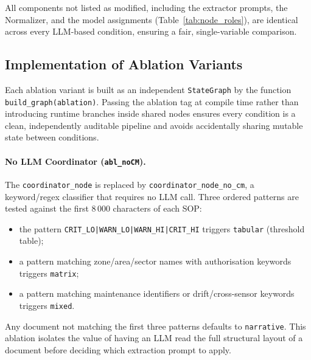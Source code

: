 ﻿\documentclass[11pt]{article}
\begin{document}
All components not listed as modified, including the extractor prompts, the
Normalizer, and the model assignments (Table~\ref{tab:node_roles}), are
identical across every LLM-based condition, ensuring a fair, single-variable
comparison.

\subsection{Implementation of Ablation Variants}
\label{sec:ablation_impl}

Each ablation variant is built as an independent \texttt{StateGraph} by the
function \texttt{build\_graph(ablation)}. Passing the ablation tag at compile
time rather than introducing runtime branches inside shared nodes ensures
every condition is a clean, independently auditable pipeline and avoids
accidentally sharing mutable state between conditions.

\paragraph{No LLM Coordinator (\texttt{abl\_noCM}).}
The \texttt{coordinator\_node} is replaced by \texttt{coordinator\_node\_no\_cm},
a keyword/regex classifier that requires no LLM call.
Three ordered patterns are tested against the first 8\,000 characters of each SOP:
\begin{itemize}
    \item the pattern \texttt{CRIT\_LO|WARN\_LO|WARN\_HI|CRIT\_HI} triggers
          \texttt{tabular} (threshold table);
    \item a pattern matching zone/area/sector names with authorisation keywords
          triggers \texttt{matrix};
    \item a pattern matching maintenance identifiers or drift/cross-sensor keywords
          triggers \texttt{mixed}.
\end{itemize}
Any document not matching the first three patterns defaults to \texttt{narrative}.
This ablation isolates the value of having an LLM read the full structural layout
of a document before deciding which extraction prompt to apply.

\end{document}
